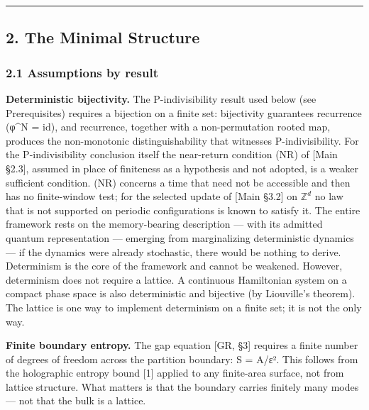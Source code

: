 \documentclass[
]{article}
\begin{document}
\begin{center}\rule{0.5\linewidth}{0.5pt}\end{center}

\hypertarget{the-minimal-structure}{%
\subsection{2. The Minimal Structure}\label{the-minimal-structure}}

\hypertarget{assumptions-by-result}{%
\subsubsection{2.1 Assumptions by result}\label{assumptions-by-result}}

\textbf{Deterministic bijectivity.} The P-indivisibility result used
below (see Prerequisites) requires a bijection on a finite set:
bijectivity guarantees recurrence (φ\^{}N = id), and recurrence,
together with a non-permutation rooted map, produces the non-monotonic
distinguishability that witnesses P-indivisibility. For the
P-indivisibility conclusion itself the near-return condition (NR) of
{[}Main §2.3{]}, assumed in place of finiteness as a hypothesis and not
adopted, is a weaker sufficient condition. (NR) concerns a time that
need not be accessible and then has no finite-window test; for the
selected update of {[}Main §3.2{]} on \(\mathbb{Z}^d\) no law that is
not supported on periodic configurations is known to satisfy it. The
entire framework rests on the memory-bearing description --- with its
admitted quantum representation --- emerging from marginalizing
deterministic dynamics --- if the dynamics were already stochastic,
there would be nothing to derive. Determinism is the core of the
framework and cannot be weakened. However, determinism does not require
a lattice. A continuous Hamiltonian system on a compact phase space is
also deterministic and bijective (by Liouville's theorem). The lattice
is one way to implement determinism on a finite set; it is not the only
way.

\textbf{Finite boundary entropy.} The gap equation {[}GR, §3{]} requires
a finite number of degrees of freedom across the partition boundary: S =
A/ε². This follows from the holographic entropy bound {[}1{]} applied to
any finite-area surface, not from lattice structure. What matters is
that the boundary carries finitely many modes --- not that the bulk is a
lattice.
\end{document}
